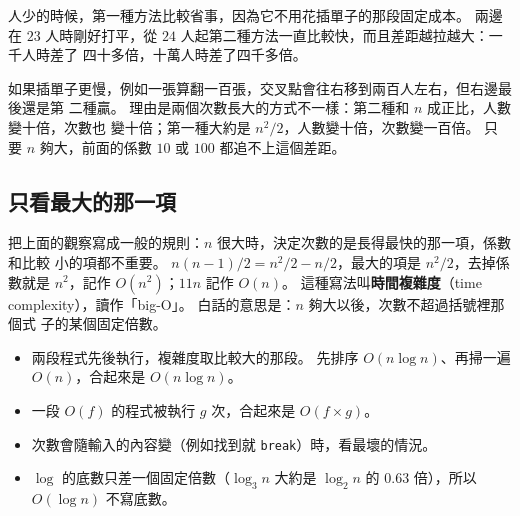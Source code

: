 人少的時候，第一種方法比較省事，因為它不用花插單子的那段固定成本。 兩邊在 $23$
人時剛好打平，從 $24$ 人起第二種方法一直比較快，而且差距越拉越大：一千人時差了
四十多倍，十萬人時差了四千多倍。

\begin{center}
\label{fig:crossover}
\end{center}

如果插單子更慢，例如一張算翻一百張，交叉點會往右移到兩百人左右，但右邊最後還是第
二種贏。 理由是兩個次數長大的方式不一樣：第二種和 $n$ 成正比，人數變十倍，次數也
變十倍；第一種大約是 $n^2/2$，人數變十倍，次數變一百倍。 只要 $n$ 夠大，前面的係數
$10$ 或 $100$ 都追不上這個差距。

\subsection{只看最大的那一項}

把上面的觀察寫成一般的規則：$n$ 很大時，決定次數的是長得最快的那一項，係數和比較
小的項都不重要。 $n(n - 1)/2 = n^2/2 - n/2$，最大的項是 $n^2/2$，去掉係數就是
$n^2$，記作 $O(n^2)$；$11n$ 記作 $O(n)$。 這種寫法叫\textbf{時間複雜度}（time
complexity），讀作「big-O」。 白話的意思是：$n$ 夠大以後，次數不超過括號裡那個式
子的某個固定倍數。

\begin{itemize}
\item 兩段程式先後執行，複雜度取比較大的那段。 先排序 $O(n \log n)$、再掃一遍
$O(n)$，合起來是 $O(n \log n)$。
\item 一段 $O(f)$ 的程式被執行 $g$ 次，合起來是 $O(f \times g)$。
\item 次數會隨輸入的內容變（例如找到就 \texttt{break}）時，看最壞的情況。
\item $\log$ 的底數只差一個固定倍數（$\log_3 n$ 大約是 $\log_2 n$ 的 $0.63$ 倍），所以
$O(\log n)$ 不寫底數。
\end{itemize}

